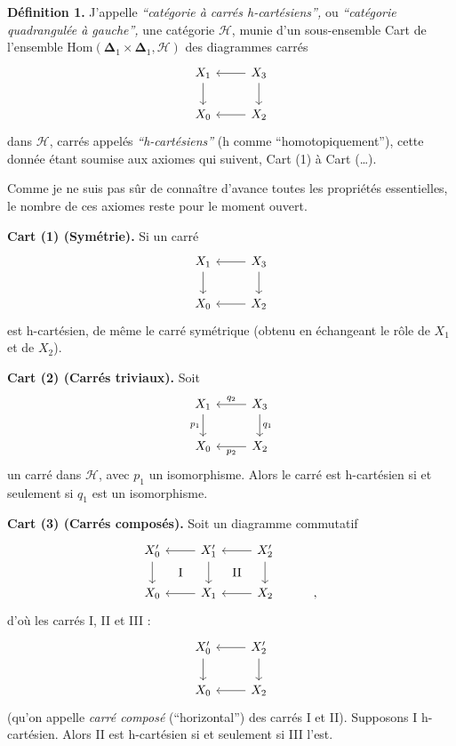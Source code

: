 \documentclass[11pt]{article}
\newcommand{\printedpage}[1]{\marginpar{\footnotesize p.~#1}}
\newcommand{\msp}[1]{\marginpar{\footnotesize [#1]}}
\begin{document}
\noindent\textbf{Définition 1.} J'appelle \textit{“catégorie à carrés h-cartésiens”,} ou \textit{“catégorie quadrangulée à gauche”,} une catégorie $\mathcal{H}$, munie d'un sous-ensemble Cart de l'ensemble $\mathrm{Hom}(\boldsymbol{\Delta}_1\times\boldsymbol{\Delta}_1,\mathcal{H})$
\printedpage{2}
des diagrammes carrés
\[
\begin{tikzcd}
X_1 \arrow[d] & X_3 \arrow[l] \arrow[d] \\
X_0 & X_2 \arrow[l]
\end{tikzcd}
\]
dans $\mathcal{H}$, carrés appelés \textit{“h-cartésiens”} (h comme “homotopiquement”), cette \msp{page 3} donnée étant soumise aux axiomes qui suivent, Cart (1) à Cart (\ldots).

\noindent Comme je ne suis pas sûr de connaître d'avance toutes les propriétés essentielles, le nombre de ces axiomes reste pour le moment ouvert.

\noindent\textbf{Cart (1) (Symétrie).} Si un carré
\[
\begin{tikzcd}
X_1 \arrow[d] & X_3 \arrow[l] \arrow[d] \\
X_0 & X_2 \arrow[l]
\end{tikzcd}
\]
est h-cartésien, de même le carré symétrique (obtenu en échangeant le rôle de $X_1$ et de $X_2$).

\noindent\textbf{Cart (2) (Carrés triviaux).} Soit
\[
\begin{tikzcd}
X_1 \arrow[d, "p_1"'] & X_3 \arrow[l, "q_2"'] \arrow[d, "q_1"] \\
X_0 & X_2 \arrow[l, "p_2"]
\end{tikzcd}
\]
un carré dans $\mathcal{H}$, avec $p_1$ un isomorphisme. Alors le carré est h-cartésien si et seulement si $q_1$ est un isomorphisme.

\noindent\textbf{Cart (3) (Carrés composés).} Soit un diagramme commutatif
\[
\begin{tikzcd}
X'_0 \arrow[d] \arrow[dr, phantom, "\mathrm{I}"] & X'_1 \arrow[l] \arrow[d] \arrow[dr, phantom, "\mathrm{II}"] & X'_2 \arrow[l] \arrow[d] & \\
X_0 & X_1 \arrow[l] & X_2 \arrow[l] & ,
\end{tikzcd}
\]
d'où les carrés I, II et III :
\[
\begin{tikzcd}
X'_0 \arrow[d] & X'_2 \arrow[l] \arrow[d] \\
X_0 & X_2 \arrow[l]
\end{tikzcd}
\]
\printedpage{3}
(qu'on appelle \textit{carré composé} (“horizontal”) des carrés I et II). Supposons I h-cartésien. Alors II est h-cartésien si et seulement si III l'est.
\end{document}

